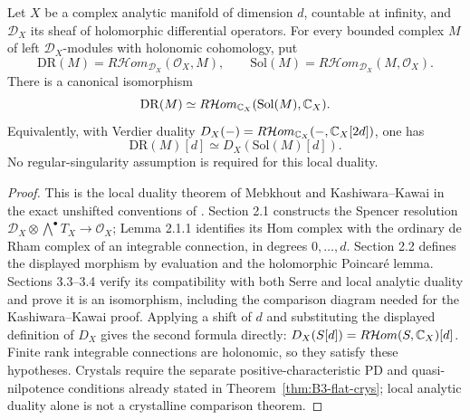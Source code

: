 \begin{theorem}\label{thm:B3-dmodule}
Let $X$ be a complex analytic manifold of dimension $d$, countable
at infinity, and $\mathcal D_X$ its sheaf of holomorphic differential
operators. For every bounded complex $M$ of left $\mathcal D_X$-modules
with holonomic cohomology, put
\[
 \mathrm{DR}(M)=R\mathcal Hom_{\mathcal D_X}(\mathcal O_X,M),
 \qquad
 \mathrm{Sol}(M)=R\mathcal Hom_{\mathcal D_X}(M,\mathcal O_X).
\]
There is a canonical isomorphism
\[
 \mathrm{DR}(M)\simeq
 R\mathcal Hom_{{\mathbb{C}}_X}(\mathrm{Sol}(M),{\mathbb{C}}_X).
\]
Equivalently, with Verdier duality
$D_X(-)=R\mathcal Hom_{{\mathbb{C}}_X}(-,{\mathbb{C}}_X[2d])$, one has
\[
 \mathrm{DR}(M)[d]\simeq D_X(\mathrm{Sol}(M)[d]).
\]
No regular-singularity assumption is required for this local duality.
\end{theorem}
\begin{proof}
This is the local duality theorem of Mebkhout and Kashiwara--Kawai
in the exact unshifted conventions of
\cite[Theorem 3.1.1, p.~67]{BNarvaez2004}.
Section 2.1 constructs the Spencer resolution
$\mathcal D_X\otimes\bigwedge^\bullet T_X\to\mathcal O_X$;
Lemma 2.1.1 identifies its Hom complex with the ordinary de Rham
complex of an integrable connection, in degrees $0,\ldots,d$.
Section 2.2 defines the displayed morphism by evaluation and the
holomorphic Poincar\'e lemma. Sections 3.3--3.4 verify its
compatibility with both Serre and local analytic duality and prove
it is an isomorphism, including the comparison diagram needed for
the Kashiwara--Kawai proof. Applying a shift of $d$ and substituting
the displayed definition of $D_X$ gives the second formula directly:
$D_X(S[d])=R\mathcal Hom(S,{\mathbb{C}}_X)[d]$.
Finite rank integrable connections are holonomic, so they satisfy
these hypotheses. Crystals require the separate positive-characteristic
PD and quasi-nilpotence conditions already stated in
Theorem~\ref{thm:B3-flat-crys}; local analytic duality alone is not a
crystalline comparison theorem.
\end{proof}

